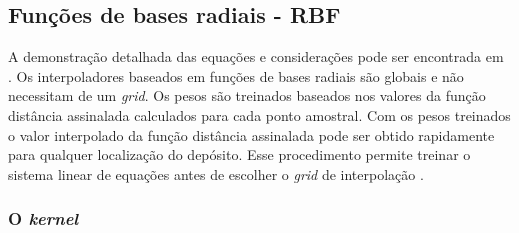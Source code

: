 \begin{table}[H]
\centering
{}
\caption{\textit{Benchmark} dos diferentes métodos de interpolação.} \label{bench}
\end{table}

\subsection{Funções de bases radiais - RBF}

A demonstração detalhada das equações e considerações  pode ser encontrada em . Os interpoladores baseados em funções de bases radiais são globais e não necessitam de um \textit{grid}. Os pesos são treinados baseados nos valores da função distância assinalada calculados para cada ponto amostral. Com os pesos treinados o valor interpolado da função distância assinalada pode ser obtido rapidamente para qualquer localização do depósito. Esse procedimento permite treinar o sistema linear de equações antes de escolher o \textit{grid} de interpolação \cite{martin2017implicitmodeling}.

\subsubsection{O \textit{kernel}}

